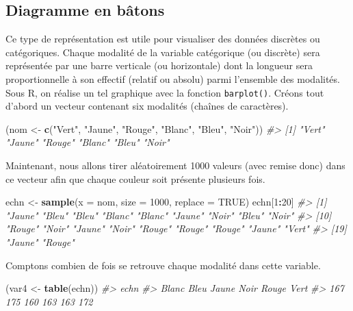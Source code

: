 \documentclass[]{article}
\newenvironment{Shaded}{\begin{snugshade}}{\end{snugshade}}
\newcommand{\CommentTok}[1]{\textcolor[rgb]{0.56,0.35,0.01}{\textit{#1}}}
\newcommand{\DataTypeTok}[1]{\textcolor[rgb]{0.13,0.29,0.53}{#1}}
\newcommand{\DecValTok}[1]{\textcolor[rgb]{0.00,0.00,0.81}{#1}}
\newcommand{\KeywordTok}[1]{\textcolor[rgb]{0.13,0.29,0.53}{\textbf{#1}}}
\newcommand{\NormalTok}[1]{#1}
\newcommand{\OperatorTok}[1]{\textcolor[rgb]{0.81,0.36,0.00}{\textbf{#1}}}
\newcommand{\OtherTok}[1]{\textcolor[rgb]{0.56,0.35,0.01}{#1}}
\newcommand{\StringTok}[1]{\textcolor[rgb]{0.31,0.60,0.02}{#1}}
\begin{document}
\hypertarget{diagramme-en-buxe2tons}{%
\subsection{Diagramme en bâtons}\label{diagramme-en-buxe2tons}}

Ce type de représentation est utile pour visualiser des données discrètes ou catégoriques. Chaque modalité de la variable catégorique (ou discrète) sera représentée par une barre verticale (ou horizontale) dont la longueur sera proportionnelle à son effectif (relatif ou absolu) parmi l'ensemble des modalités. Sous R, on réalise un tel graphique avec la fonction \texttt{barplot()}.
Créons tout d'abord un vecteur contenant six modalités (chaînes de caractères).

\begin{Shaded}
\begin{Highlighting}[]
\NormalTok{(nom <-}\StringTok{ }\KeywordTok{c}\NormalTok{(}\StringTok{"Vert"}\NormalTok{, }\StringTok{"Jaune"}\NormalTok{, }\StringTok{"Rouge"}\NormalTok{, }\StringTok{"Blanc"}\NormalTok{, }\StringTok{"Bleu"}\NormalTok{, }\StringTok{"Noir"}\NormalTok{))}
\CommentTok{#> [1] "Vert"  "Jaune" "Rouge" "Blanc" "Bleu"  "Noir"}
\end{Highlighting}
\end{Shaded}

Maintenant, nous allons tirer aléatoirement 1000 valeurs (avec remise donc) dans ce vecteur afin que chaque couleur soit présente plusieurs fois.

\begin{Shaded}
\begin{Highlighting}[]
\NormalTok{echn <-}\StringTok{ }\KeywordTok{sample}\NormalTok{(}\DataTypeTok{x =}\NormalTok{ nom, }\DataTypeTok{size =} \DecValTok{1000}\NormalTok{, }\DataTypeTok{replace =} \OtherTok{TRUE}\NormalTok{)}
\NormalTok{echn[}\DecValTok{1}\OperatorTok{:}\DecValTok{20}\NormalTok{]}
\CommentTok{#>  [1] "Jaune" "Bleu"  "Bleu"  "Blanc" "Blanc" "Jaune" "Noir"  "Bleu"  "Noir" }
\CommentTok{#> [10] "Rouge" "Noir"  "Jaune" "Noir"  "Rouge" "Rouge" "Rouge" "Jaune" "Vert" }
\CommentTok{#> [19] "Jaune" "Rouge"}
\end{Highlighting}
\end{Shaded}

Comptons combien de fois se retrouve chaque modalité dans cette variable.

\begin{Shaded}
\begin{Highlighting}[]
\NormalTok{(var4 <-}\StringTok{ }\KeywordTok{table}\NormalTok{(echn))}
\CommentTok{#> echn}
\CommentTok{#> Blanc  Bleu Jaune  Noir Rouge  Vert }
\CommentTok{#>   167   175   160   163   163   172}
\end{Highlighting}
\end{Shaded}
\end{document}
